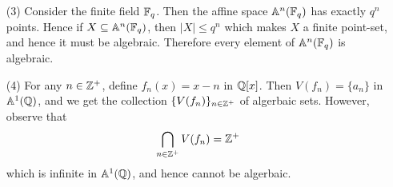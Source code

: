 \begin{example}
\begin{enumerate}
    \item[(3)] Consider the finite field $\mathbb{F}_q$. Then the affine space
      $\mathbb{A}^n(\mathbb{F}_q)$ has exactly $q^n$ points. Hence if $X \subseteq
      \mathbb{A}^n(\mathbb{F}_q)$, then $|X| \leq q^n$ which makes $X$ a finite
      point-set, and hence it must be algebraic. Therefore every
      element of $\mathbb{A}^n(\mathbb{F}_q)$ is algebraic.

    \item[(4)] For any $n \in \mathbb{Z}^+$, define $f_n(x)=x-n$ in $\mathbb{Q}[x]$.
      Then $V(f_n)=\{a_n\}$ in $\mathbb{A}^1(\mathbb{Q})$, and we get the collection
      $\{V(f_n)\}_{n \in \mathbb{Z}^+}$ of algerbaic sets. However, observe
      that
      \begin{equation*}
        \bigcap_{n \in \mathbb{Z}^+}{V(f_n)}=\mathbb{Z}^+
      \end{equation*}
      which is infinite in $\mathbb{A}^1(\mathbb{Q})$, and hence cannot be algerbaic.
  \end{enumerate}
\end{example}

